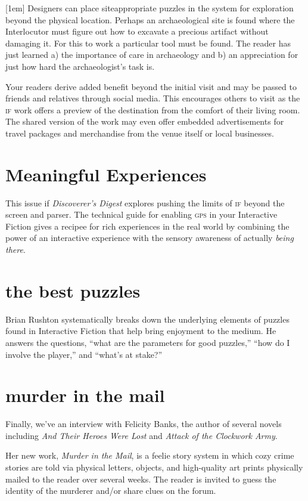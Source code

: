 [1em]
Designers can place site\textendash appropriate puzzles in the system for
exploration beyond the physical location. Perhaps an archaeological site is found where the
Interlocutor must figure out how to excavate a precious artifact without
damaging it. For this to work a  particular tool must be found. The reader has
just learned a) the importance of care in archaeology and b) an appreciation for
just how hard the archaeologist's task is. 

Your readers derive added benefit beyond the initial visit and may be passed to
friends and relatives through social media. This encourages others to visit as
the \textsc{if} work offers a preview of the destination from the comfort of
their living room. The shared version of
the work may even
offer embedded advertisements for travel packages and merchandise from the venue
itself or local businesses.

\section{Meaningful Experiences}
This issue if \emph{Discoverer's Digest} explores pushing the limits of
\textsc{if} beyond the screen and parser. The technical guide for enabling
\textsc{gps} in your Interactive Fiction gives a recipee for rich experiences in
the real world by combining the power of an interactive experience with the
sensory awareness of actually \emph{being there}.
\section{the best puzzles}
Brian Rushton systematically breaks down the underlying elements of puzzles
found in Interactive Fiction that help bring enjoyment to the medium. He answers
the questions, ``what are the parameters for good puzzles,'' ``how do I involve
the player,'' and ``what's at stake?''

\section{murder in the mail}
Finally, we've an interview with Felicity Banks, the author of several novels
including \emph{And Their Heroes Were Lost} and \emph{Attack of the Clockwork
  Army}.

Her new work, \emph{Murder in the Mail}, is a feelie story system in which cozy
crime stories are told via physical letters, objects, and high-quality art
prints physically mailed to the reader over several weeks. The reader is invited to guess the identity of the murderer and/or share clues on the forum.

